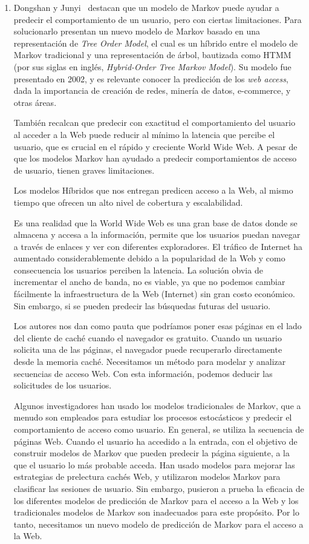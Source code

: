 \begin{enumerate}
  \item Dongshan y Junyi~\cite{Dongshan2002} destacan que un modelo de Markov puede ayudar a predecir el comportamiento de un usuario, pero con ciertas limitaciones.  Para solucionarlo presentan un nuevo modelo de Markov basado en una representación de \emph{Tree Order Model}, el cual es un híbrido entre el modelo de Markov tradicional y una representación de árbol, bautizada como HTMM (por sus siglas en inglés, \emph{Hybrid-Order Tree Markov Model}).
  Su modelo fue presentado en 2002, y es relevante conocer la predicción de los \emph{web access}, dada la importancia de creación de redes,  minería de datos, e-commerce, y otras áreas.
  
  También recalcan que predecir con exactitud el comportamiento del usuario al acceder a la Web puede reducir al mínimo la latencia que percibe el usuario, que es crucial en el rápido y creciente World Wide Web. A pesar de que los modelos Markov han ayudado a predecir comportamientos de acceso de usuario, tienen graves limitaciones. 
  
  Los modelos Híbridos que nos entregan predicen acceso a la Web, al mismo tiempo que ofrecen un alto nivel de cobertura y escalabilidad.
  
  Es una realidad que la World Wide Web es una gran base de datos donde se almacena  y  accesa a la información, permite que los  usuarios puedan navegar a través de enlaces y ver con diferentes exploradores. El tráfico de Internet ha aumentado considerablemente debido a la popularidad de la Web y como consecuencia los usuarios perciben la latencia. La solución obvia de incrementar el ancho de banda, no es viable, ya que no podemos cambiar fácilmente la infraestructura de la Web (Internet) sin gran costo económico. Sin embargo, si se pueden predecir las búsquedas futuras del usuario.
  
  Los autores nos dan como pauta que podríamos poner esas páginas en el lado del cliente de caché cuando el navegador es gratuito. Cuando un usuario solicita una de las páginas, el navegador puede recuperarlo directamente desde la memoria caché. Necesitamos un método para modelar y analizar secuencias de acceso Web. Con esta información, podemos deducir las solicitudes de los usuarios.
  
  Algunos investigadores han usado los modelos tradicionales de Markov, que a menudo son empleados para estudiar los procesos estocásticos y predecir el comportamiento de acceso como usuario. En general, se utiliza la secuencia de páginas Web. Cuando el usuario ha accedido a la entrada, con el objetivo de construir modelos de Markov que pueden predecir la página siguiente, a la que el usuario lo más probable acceda.  Han usado  modelos para mejorar las estrategias de prelectura cachés Web, y  utilizaron modelos Markov para clasificar las sesiones de usuario.  Sin embargo, pusieron a prueba la eficacia de los diferentes modelos de predicción de Markov para el acceso a la Web y los tradicionales modelos de Markov son inadecuados para este propósito. Por lo tanto, necesitamos un nuevo modelo de predicción de Markov para el acceso a la Web.
  

\end{enumerate}
